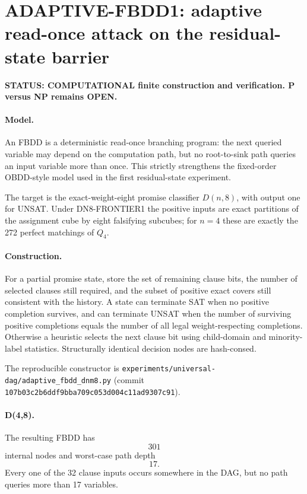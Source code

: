 \section*{ADAPTIVE-FBDD1: adaptive read-once attack on the residual-state barrier}

\textbf{STATUS: COMPUTATIONAL finite construction and verification. P versus NP remains OPEN.}

\paragraph{Model.}
An FBDD is a deterministic read-once branching program: the next queried variable may depend on the computation path, but no root-to-sink path queries an input variable more than once. This strictly strengthens the fixed-order OBDD-style model used in the first residual-state experiment.

The target is the exact-weight-eight promise classifier \(D(n,8)\), with output one for UNSAT. Under DN8-FRONTIER1 the positive inputs are exact partitions of the assignment cube by eight falsifying subcubes; for \(n=4\) these are exactly the 272 perfect matchings of \(Q_4\).

\paragraph{Construction.}
For a partial promise state, store the set of remaining clause bits, the number of selected clauses still required, and the subset of positive exact covers still consistent with the history. A state can terminate SAT when no positive completion survives, and can terminate UNSAT when the number of surviving positive completions equals the number of all legal weight-respecting completions. Otherwise a heuristic selects the next clause bit using child-domain and minority-label statistics. Structurally identical decision nodes are hash-consed.

The reproducible constructor is
\texttt{experiments/universal-dag/adaptive\_fbdd\_dnm8.py}
(commit \texttt{107b03c2b6ddf9bba709c053d004c11ad9307c91}).

\paragraph{D(4,8).}
The resulting FBDD has
\[
\boxed{301}
\]
internal nodes and worst-case path depth
\[
\boxed{17}.
\]
Every one of the 32 clause inputs occurs somewhere in the DAG, but no path queries more than 17 variables.

